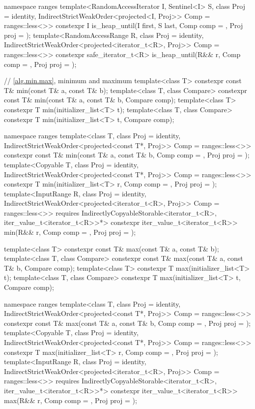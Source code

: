 \begin{codeblock}
{  namespace ranges {
    template<RandomAccessIterator I, Sentinel<I> S, class Proj = identity,
             IndirectStrictWeakOrder<projected<I, Proj>> Comp = ranges::less<>>
      constexpr I is_heap_until(I first, S last, Comp comp = {}, Proj proj = {});
    template<RandomAccessRange R, class Proj = identity,
             IndirectStrictWeakOrder<projected<iterator_t<R>, Proj>> Comp = ranges::less<>>
      constexpr safe_iterator_t<R>
        is_heap_until(R&& r, Comp comp = {}, Proj proj = {});
  }

  // \ref{alg.min.max}, minimum and maximum
  template<class T> constexpr const T& min(const T& a, const T& b);
  template<class T, class Compare>
    constexpr const T& min(const T& a, const T& b, Compare comp);
  template<class T>
    constexpr T min(initializer_list<T> t);
  template<class T, class Compare>
    constexpr T min(initializer_list<T> t, Compare comp);

  namespace ranges {
    template<class T, class Proj = identity,
             IndirectStrictWeakOrder<projected<const T*, Proj>> Comp = ranges::less<>>
      constexpr const T& min(const T& a, const T& b, Comp comp = {}, Proj proj = {});
    template<Copyable T, class Proj = identity,
             IndirectStrictWeakOrder<projected<const T*, Proj>> Comp = ranges::less<>>
      constexpr T min(initializer_list<T> r, Comp comp = {}, Proj proj = {});
    template<InputRange R, class Proj = identity,
             IndirectStrictWeakOrder<projected<iterator_t<R>, Proj>> Comp = ranges::less<>>
      requires IndirectlyCopyableStorable<iterator_t<R>, iter_value_t<iterator_t<R>>*>
      constexpr iter_value_t<iterator_t<R>>
        min(R&& r, Comp comp = {}, Proj proj = {});
  }

  template<class T> constexpr const T& max(const T& a, const T& b);
  template<class T, class Compare>
    constexpr const T& max(const T& a, const T& b, Compare comp);
  template<class T>
    constexpr T max(initializer_list<T> t);
  template<class T, class Compare>
    constexpr T max(initializer_list<T> t, Compare comp);

  namespace ranges {
    template<class T, class Proj = identity,
             IndirectStrictWeakOrder<projected<const T*, Proj>> Comp = ranges::less<>>
      constexpr const T& max(const T& a, const T& b, Comp comp = {}, Proj proj = {});
    template<Copyable T, class Proj = identity,
             IndirectStrictWeakOrder<projected<const T*, Proj>> Comp = ranges::less<>>
      constexpr T max(initializer_list<T> r, Comp comp = {}, Proj proj = {});
    template<InputRange R, class Proj = identity,
             IndirectStrictWeakOrder<projected<iterator_t<R>, Proj>> Comp = ranges::less<>>
      requires IndirectlyCopyableStorable<iterator_t<R>, iter_value_t<iterator_t<R>>*>
      constexpr iter_value_t<iterator_t<R>>
        max(R&& r, Comp comp = {}, Proj proj = {});
  }

}
\end{codeblock}
